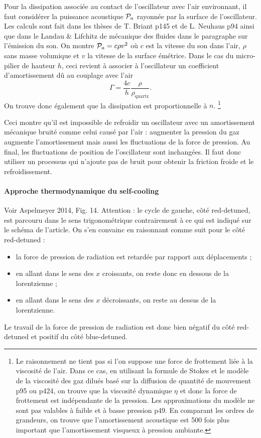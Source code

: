 \documentclass[12pt,a4paper]{article}
\begin{document}
Pour la dissipation associée au contact de l'oscillateur avec l'air environnant, il faut considérer la puissance acoustique ${\cal{P}}_a$ rayonnée par la surface de l'oscillateur.
Les calculs sont fait dans les thèses de T. Briant p145 et de L. Neuhaus p94 ainsi que dans le Landau \& Lifchitz de mécanique des fluides dans le paragraphe sur l'émission du son.
On montre ${\cal{P}}_a = c \rho v^2$ où $c$ est la vitesse du son dans l'air, $\rho$ sans masse volumique et $v$ la vitesse de la surface émétrice. Dans le cas du micro-pilier de hauteur $h$, ceci revient à associer à l'oscillateur un coefficient d'amortissement dû au couplage avec l'air
\begin{equation}
\Gamma = \frac{4c}{h} \frac{\rho}{\rho_\mathrm{quartz}}.
\end{equation}
On trouve donc également que la dissipation est proportionnelle à $n$.
\footnote{Le raisonnement ne tient pas si l'on suppose une force de frottement liée à la viscosité de l'air.
Dans ce cas, en utilisant la formule de Stokes et le modèle de la viscosité des gaz dilués basé sur la diffusion de quantité de mouvement \cite{Guyon2001} p95 ou \cite{Olivier2000} p424, on trouve que la viscosité dynamique $\eta$ et donc la force de frottement est indépendante de la pression.
Les approximations du modèle ne sont pas valables à faible et à basse pression \cite{Guyon2001} p49.
En comparant les ordres de grandeurs, on trouve que l'amortissement acoustique est 500 fois plus important que l'amortissement visqueux à pression ambiante.}

Ceci montre qu'il est impossible de refroidir un oscillateur avec un amortissement mécanique bruité comme celui causé par l'air : augmenter la pression du gaz augmente l'amortissement mais aussi les fluctuations de la force de pression.
Au final, les fluctuations de position de l'oscillateur sont inchangées.
Il faut donc utiliser un processus qui n'ajoute pas de bruit pour obtenir la friction froide et le refroidissement.

\paragraph{Approche thermodynamique du self-cooling\\}
Voir Aspelmeyer 2014, Fig. 14.
Attention : le cycle de gauche, côté red-detuned, est parcouru dans le sens trigonométrique contrairement à ce qui est indiqué sur le schéma de l'article.
On s'en convainc en raisonnant comme suit pour le côté red-detuned :
\begin{itemize}
\item la force de pression de radiation est retardée par rapport aux déplacements ;
\item en allant dans le sens des $x$ croissants, on reste donc en dessous de la lorentzienne ;
\item en allant dans le sens des $x$ décroissants, on reste au dessus de la lorentzienne.
\end{itemize}
Le travail de la force de pression de radiation est donc bien négatif du côté red-detuned et positif du côté blue-detuned.
\end{document}
